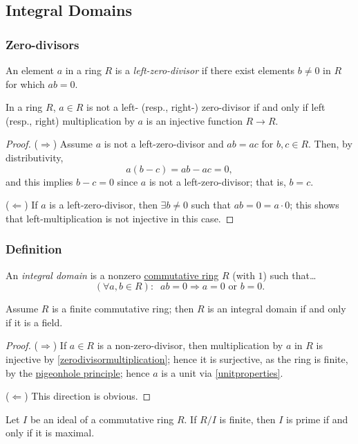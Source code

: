 \subsection{Integral Domains}

\subsubsection{Zero-divisors}\label{zerodivisors}
An element $a$ in a ring $R$ is a \emph{left-zero-divisor} if there exist elements $b \neq 0$
in $R$ for which $ab = 0$.

\begin{proposition}
\label{zerodivisormultiplication}
In a ring $R$, $a \in R$ is not a left- (resp., right-) zero-divisor if and only if left (resp., right)
multiplication by $a$ is an injective function $R \rightarrow R$.
\end{proposition}

\begin{proof}
($\Rightarrow$) Assume $a$ is not a left-zero-divisor and $ab = ac$ for $b,c \in R$. Then, by distributivity,
$$a(b-c) = ab - ac = 0,$$
and this implies $b-c = 0$ since $a$ is not a left-zero-divisor; that is, $b = c$.

($\Leftarrow$) If $a$ is a left-zero-divisor, then $\exists b \neq 0$ such that $ab = 0 = a \cdot 0$; this shows that
left-multiplication is not injective in this case.
\end{proof}

\subsubsection{Definition}\label{integraldomaindefinition}
An \emph{integral domain} is a nonzero \hyperref[commutativeringdefinition]{commutative ring} $R$ (with $1$) such that\dots
$$(\forall a,b \in R): \; \; ab =0 \Rightarrow a=0 \textrm{ or } b=0.$$

\begin{proposition}
Assume $R$ is a finite commutative ring; then $R$ is an integral domain if and only if it is a field.
\end{proposition}

\begin{proof}
($\Rightarrow$) If $a \in R$ is a non-zero-divisor, then multiplication by $a$ in $R$ is injective by \ref{zerodivisormultiplication};
hence it is surjective, as the ring is finite, by the \hyperref[pigeonholeprinciplecombinatorics]{pigeonhole principle}; hence $a$ is
a unit via \ref{unitproperties}.

($\Leftarrow$) This direction is obvious.
\end{proof}

\begin{corollary}
Let $I$ be an ideal of a commutative ring $R$. If $R/I$ is finite, then $I$ is prime if and only if it is maximal.
\end{corollary}

